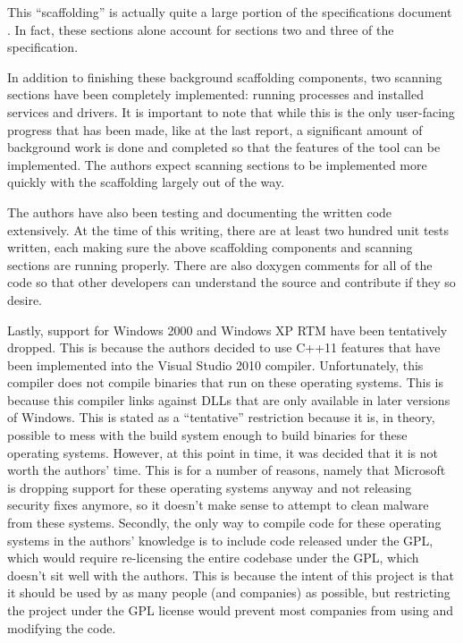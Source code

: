 \documentclass[letterpaper,12pt]{article}
\begin{document}
This ``scaffolding'' is actually quite a large portion of the specifications
document \cite{Specification}.  In fact, these sections alone account for
sections two and three of the specification.

In addition to finishing these background scaffolding components, two scanning
sections have been completely implemented: running processes and installed
services and drivers.  It is important to note that while this is the only
user-facing progress that has been made, like at the last report, a significant
amount of background work is done and completed so that the features of the tool
can be implemented.  The authors expect scanning sections to be implemented more
quickly with the scaffolding largely out of the way.

The authors have also been testing and documenting the written code extensively.
At the time of this writing, there are at least two hundred unit tests written,
each making sure the above scaffolding components and scanning sections are
running properly.  There are also doxygen comments for all of the code so that
other developers can understand the source and contribute if they so desire.

Lastly, support for Windows 2000 and Windows XP RTM have been tentatively
dropped.  This is because the authors decided to use C++11 features that have
been implemented into the Visual Studio 2010 compiler.  Unfortunately, this
compiler does not compile binaries that run on these operating systems.  This is
because this compiler links against DLLs that are only available in later
versions of Windows.  This is stated as a ``tentative'' restriction because it
is, in theory, possible to mess with the build system enough to build binaries
for these operating systems.  However, at this point in time, it was decided
that it is not worth the authors' time.  This is for a number of reasons, namely
that Microsoft is dropping support for these operating systems anyway and not
releasing security fixes anymore, so it doesn't make sense to attempt to clean
malware from these systems.  Secondly, the only way to compile code for these
operating systems in the authors' knowledge is to include code released under
the GPL, which would require re-licensing the entire codebase under the GPL,
which doesn't sit well with the authors.  This is because the intent of this
project is that it should be used by as many people (and companies) as possible,
but restricting the project under the GPL license would prevent most companies
from using and modifying the code.  
\end{document}
